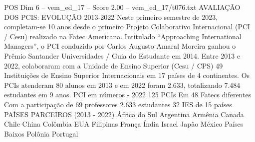 \begin{textsample}{POS Dim 6 – vem\_ed\_17 – Score 2.00 – vem\_ed\_17/t076.txt}  \label{ex:f6_pos_041}
AVALIAÇÃO DOS PCIS: EVOLUÇÃO 2013-2022 Neste primeiro semestre de 2023, completam-se 10 anos desde o primeiro Projeto Colaborativo Internacional (PCI / Cesu) realizado na Fatec Americana.
Intitulado “Approaching International Managers”, o PCI conduzido por Carlos Augusto Amaral Moreira ganhou o Prêmio Santander Universidades / Guia do Estudante em 2014.
Entre 2013 e 2022, colaboraram com a Unidade de Ensino Superior (Cesu / CPS) 49 Instituições de Ensino Superior Internacionais em 17 países de 4 continentes.
Os PCIs atenderam 80 alunos em 2013 e em 2022 foram 2.633, totalizando 7.484 estudantes em 9 anos.
PCI em números - 2022 125 PCIs Em 48 Fatecs diferentes Com a participação de 69 professores 2.633 estudantes 32 IES de 15 países PAÍSES PARCEIROS (2013 - 2022) África do Sul Argentina Armênia Canada Chile China Colômbia EUA Filipinas França Índia Israel Japão México Países Baixos Polônia Portugal

\end{textsample}

